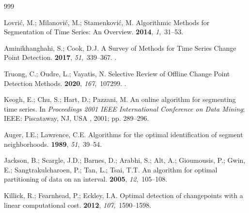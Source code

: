 \documentclass[mathematics,article,accept,pdftex,moreauthors]{Definitions/mdpi}
\begin{document}
%
\begin{thebibliography}{999}

Lovri{\'c}, M.; Milanovi{\'c}, M.; Stamenkovi{\'c}, M.
\newblock Algorithmic Methods for Segmentation of Time Series: An Overview.
 {\bf
  2014}, {\em 1},~31--53.

Aminikhanghahi, S.; Cook, D.J.
\newblock A Survey of Methods for Time Series Change Point Detection.
 {\bf 2017}, {\em
  51},~339--367.
.

Truong, C.; Oudre, L.; Vayatis, N.
\newblock Selective Review of Offline Change Point Detection Methods.
 {\bf 2020}, {\em 167},~107299.
.

Keogh, E.; Chu, S.; Hart, D.; Pazzani, M.
\newblock An online algorithm for segmenting time series.  In \textit{Proceedings 2001 IEEE International Conference on Data Mining}; IEEE: Piscataway, NJ, USA %
, 2001; pp. 289--296.


Auger, I.E.; Lawrence, C.E.
\newblock Algorithms for the optimal identification of segment neighborhoods.
 {\bf 1989}, {\em 51},~39--54.

Jackson, B.; Scargle, J.D.; Barnes, D.; Arabhi, S.; Alt, A.; Gioumousis, P.;
  Gwin, E.; Sangtrakulcharoen, P.; Tan, L.; Tsai, T.T.
\newblock An algorithm for optimal partitioning of data on an interval.
 {\bf 2005}, {\em 12},~105--108.

Killick, R.; Fearnhead, P.; Eckley, I.A.
\newblock Optimal detection of changepoints with a linear computational cost.
 {\bf 2012},
  {\em 107},~1590--1598.


\end{thebibliography}
\end{document}

